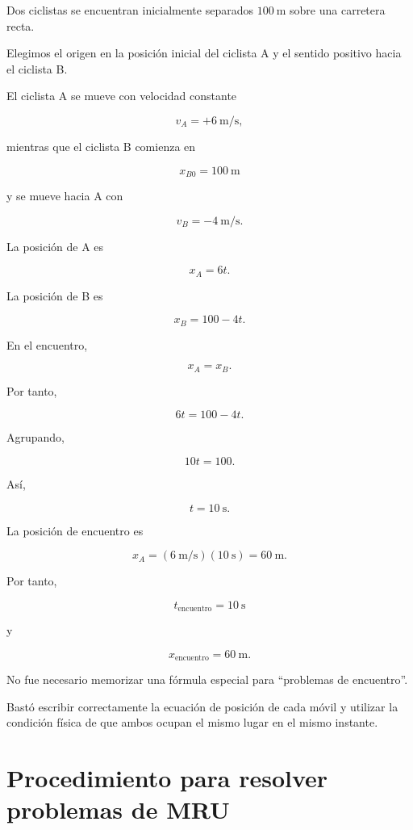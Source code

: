 \begin{ejemplo}

Dos ciclistas se encuentran inicialmente separados
\(\SI{100}{\meter}\) sobre una carretera recta.

Elegimos el origen en la posición inicial del ciclista A y el sentido
positivo hacia el ciclista B.

El ciclista A se mueve con velocidad constante

\[ v_A=+\SI{6}{\meter\per\second}, \]

mientras que el ciclista B comienza en

\[ x_{B0}=\SI{100}{\meter} \]

y se mueve hacia A con

\[ v_B=-\SI{4}{\meter\per\second}. \]

La posición de A es

\[ x_A=6t. \]

La posición de B es

\[ x_B=100-4t. \]

En el encuentro,

\[ x_A=x_B. \]

Por tanto,

\[
6t=100-4t.
\]

Agrupando,

\[
10t=100.
\]

Así,

\[ t=\SI{10}{\second}. \]

La posición de encuentro es

\[
x_A
=
\left(\SI{6}{\meter\per\second}\right)
\left(\SI{10}{\second}\right)
=
\SI{60}{\meter}.
\]

Por tanto,

\[
\boxed{t_{\text{encuentro}}=\SI{10}{\second}}
\]

y

\[
\boxed{x_{\text{encuentro}}=\SI{60}{\meter}}.
\]

\begin{interpretacion}
No fue necesario memorizar una fórmula especial para ``problemas de
encuentro''.

Bastó escribir correctamente la ecuación de posición de cada móvil y utilizar
la condición física de que ambos ocupan el mismo lugar en el mismo instante.
\end{interpretacion}
\end{ejemplo}


\section{Procedimiento para resolver problemas de MRU}

